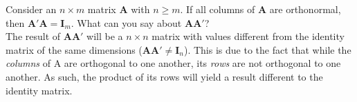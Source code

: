 \item [3.4] Consider an $n \times m$ matrix $\mathbf{A}$
with $n \geq m$. If all columns of $\mathbf{A}$ are
orthonormal, then $\mathbf{A}' \mathbf{A} = \mathbf{I}_m$. What can you say about
$\mathbf{A}\mathbf{A}'$?\\

The result of $\mathbf{A}\mathbf{A}'$ will be a $n \times n$
matrix with values different from the identity
matrix of the same dimensions
($\mathbf{A}\mathbf{A}' \neq \mathbf{I}_n$).
This is due to the fact that while the
\emph{columns} of A are orthogonal to one another,
its \emph{rows} are not orthogonal to one another.
As such, the product of its rows will yield a result
different to the identity matrix.
